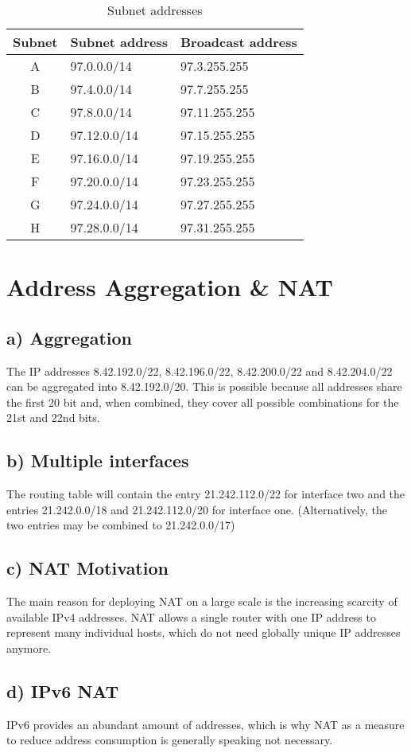 \documentclass[a4paper, 11 pt, article, accentcolor=tud7b]{tudreport}
\begin{document}
	\begin{table}[h]
	  \centering
	  \begin{tabular}{| c | l | l |}
	    \hline
	    Subnet & Subnet address & Broadcast address \\ \hline
	    A & 97.0.0.0/14 & 97.3.255.255 \\ \hline
	    B & 97.4.0.0/14 & 97.7.255.255 \\ \hline
	    C & 97.8.0.0/14 & 97.11.255.255 \\ \hline
	    D & 97.12.0.0/14 & 97.15.255.255 \\ \hline
	    E & 97.16.0.0/14 & 97.19.255.255 \\ \hline
	    F & 97.20.0.0/14 & 97.23.255.255 \\ \hline
	    G & 97.24.0.0/14 & 97.27.255.255 \\ \hline
	    H & 97.28.0.0/14 & 97.31.255.255 \\ \hline
	  \end{tabular}
	  \caption{Subnet addresses}
	\end{table}
	
	\section{Address Aggregation \& NAT}
	
	\subsection*{a) Aggregation}
	The IP addresses 8.42.192.0/22, 8.42.196.0/22, 8.42.200.0/22 and 8.42.204.0/22 can be aggregated into 8.42.192.0/20. This is possible because all addresses share the first 20 bit and, when combined, they cover all possible combinations for the 21st and 22nd bits.
	
	\subsection*{b) Multiple interfaces}
	The routing table will contain the entry 21.242.112.0/22 for interface two and the entries 21.242.0.0/18 and 21.242.112.0/20 for interface one. (Alternatively, the two entries may be combined to 21.242.0.0/17)
	
	\subsection*{c) NAT Motivation}
	The main reason for deploying NAT on a large scale is the increasing scarcity of available IPv4 addresses. NAT allows a single router with one IP address to represent many individual hosts, which do not need globally unique IP addresses anymore.
	
	\subsection*{d) IPv6 NAT}
	IPv6 provides an abundant amount of addresses, which is why NAT as a measure to reduce address consumption is generally speaking not necessary.
	
\end{document}

